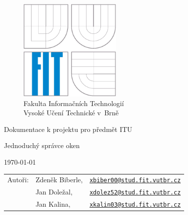 \begin{titlepage}

\begin{figure}[!h]
  \centering
  \includegraphics[height=5cm]{img/logo.eps} \\
  Fakulta Informačních Technologií \\
  Vysoké Učení Technické v~Brně
\end{figure}

\vfill

\begin{center}
\begin{Large}
Dokumentace k projektu pro předmět ITU\\
\end{Large}
\bigskip
\begin{Huge}
Jednoduchý správce oken\\
\end{Huge}
\end{center}

\vfill

\begin{center}
\begin{Large}
\today
\end{Large}
\end{center}

\vfill

\begin{flushleft}
\begin{large}
\begin{tabular}{lll}
Autoři: & Zdeněk Biberle, & \href{mailto:xbiber00@stud.fit.vutbr.cz}{\nolinkurl{xbiber00@stud.fit.vutbr.cz}} \\
        & Jan Doležal,    & \href{mailto:xdolez52@stud.fit.vutbr.cz}{\nolinkurl{xdolez52@stud.fit.vutbr.cz}} \\
        & Jan Kalina,     & \href{mailto:xkalin03@stud.fit.vutbr.cz}{\nolinkurl{xkalin03@stud.fit.vutbr.cz}} \\
\end{tabular}
\end{large}
\end{flushleft}
\end{titlepage}
